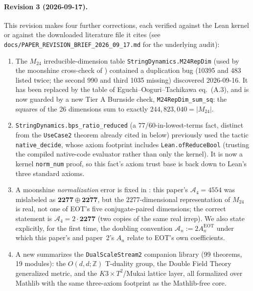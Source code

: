 \documentclass[11pt,a4paper]{article}
\theoremstyle{remark}
\begin{document}
\paragraph{Revision 3 (2026-09-17).} This revision makes four further corrections, each verified
against the Lean kernel or against the downloaded literature file it cites (see
\texttt{docs/\discretionary{}{}{}PAPER\_\discretionary{}{}{}REVISION\_\discretionary{}{}{}BRIEF\_\discretionary{}{}{}2026\_\discretionary{}{}{}09\_\discretionary{}{}{}17.md} for the underlying audit):
\begin{enumerate}
  \item The $M_{24}$ irreducible-dimension table \texttt{StringDynamics.\discretionary{}{}{}M24RepDim}
    (used by the moonshine cross-check of ) contained a duplication bug (10395
    and 483 listed twice; the second 990 and third 1035 missing) discovered 2026-09-16. It has been
    replaced by the table of Eguchi--Ooguri--Tachikawa eq.~(A.3), and is now guarded by a new Tier A
    Burnside check, \texttt{M24RepDim\_\discretionary{}{}{}sum\_\discretionary{}{}{}sq}: the squares of
    the 26 dimensions sum to exactly $244{,}823{,}040=|M_{24}|$.
  \item \texttt{StringDynamics.\discretionary{}{}{}bps\_\discretionary{}{}{}ratio\_\discretionary{}{}{}reduced}
    (a $77/60$-in-lowest-terms fact, distinct from the \texttt{UseCase2} theorem already cited in
     below) previously used the tactic \texttt{native\_\discretionary{}{}{}decide},
    whose axiom footprint includes \texttt{Lean.\discretionary{}{}{}ofReduceBool} (trusting the
    compiled native-code evaluator rather than only the kernel). It is now a kernel
    \texttt{norm\_\discretionary{}{}{}num} proof, so this fact's axiom trust base is back down to
    Lean's three standard axioms.
  \item A moonshine \emph{normalization} error is fixed in : this paper's
    $\mathcal A_4=4554$ was mislabeled as $\mathbf{2277}\oplus\overline{\mathbf{2277}}$, but the
    $2277$-dimensional representation of $M_{24}$ is real, not one of EOT's five conjugate-paired
    dimensions; the correct statement is $\mathcal A_4=2\cdot\mathbf{2277}$ (two copies of the same
    real irrep). We also state explicitly, for the first time, the doubling convention
    $\mathcal A_n:=2A_n^{\mathrm{EOT}}$ under which this paper's and paper~2's $A_n$ relate to EOT's
    own coefficients.
  \item A new  summarizes the \texttt{DualScaleStream2} companion library (99
    theorems, 19 modules): the $O(d,d;\mathbb Z)$ T-duality group, the Double Field Theory
    generalized metric, and the $K3\times T^2$/Mukai lattice layer, all formalized over Mathlib with
    the same three-axiom footprint as the Mathlib-free core.
\end{enumerate}
\end{document}
